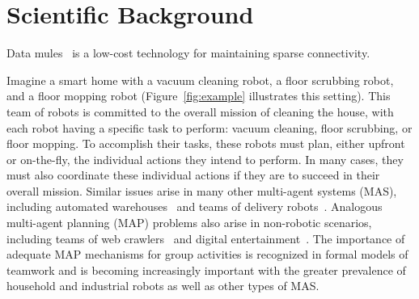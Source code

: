 \documentclass[11pt]{article}
\begin{document}

\section{Scientific Background}



Data mules~\cite{shah2003data} is a low-cost technology for maintaining sparse connectivity. 




Imagine a smart home with a vacuum cleaning robot, a floor scrubbing robot, and a floor mopping robot (Figure~\ref{fig:example} illustrates this setting). This team of robots is committed to the overall mission of cleaning the house, with each robot having a specific task to perform: vacuum cleaning, floor scrubbing, or floor mopping. To accomplish their tasks, these robots must plan, either upfront or on-the-fly, the individual actions they intend to perform. In many cases, they must also coordinate these individual actions if they are to succeed in their overall mission. Similar issues arise in many other multi-agent systems (MAS), including automated warehouses~\cite{martinez2010autonomous,vivaldini2011intelligent} and teams of delivery robots~\cite{coltin2014scheduling}.  Analogous multi-agent planning (MAP) problems also arise in non-robotic scenarios, including teams of web crawlers~\cite{chiu2005towards,pant2002myspiders,sato2012agent} and digital entertainment~\cite{jaklin2013way}.  
The importance of adequate MAP mechanisms for group activities is recognized in formal models of teamwork and is becoming increasingly important with the greater prevalence of household and industrial robots as well as other types of MAS. %


\end{document}
